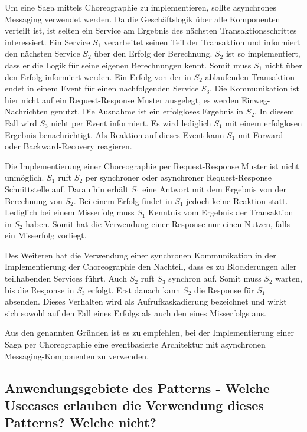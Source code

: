 Um eine Saga mittels Choreographie zu implementieren, sollte asynchrones Messaging verwendet werden. Da die Geschäftslogik über alle Komponenten verteilt ist, ist selten ein Service am Ergebnis des nächsten Transaktionsschrittes interessiert. Ein Service $S_1$ verarbeitet seinen Teil der Transaktion und informiert den nächsten Service $S_2$ über den Erfolg der Berechnung. $S_2$ ist so implementiert, dass er die Logik für seine eigenen Berechnungen kennt. Somit muss $S_1$ nicht über den Erfolg informiert werden. Ein Erfolg von der in $S_2$ ablaufenden Transaktion endet in einem Event für einen nachfolgenden Service $S_3$. Die Kommunikation ist hier nicht auf ein Request-Response Muster ausgelegt, es werden Einweg-Nachrichten genutzt.
Die Ausnahme ist ein erfolgloses Ergebnis in $S_2$. In diesem Fall wird $S_3$ nicht per Event informiert. Es wird lediglich $S_1$ mit einem erfolglosen Ergebnis benachrichtigt. Als Reaktion auf dieses Event kann $S_1$ mit Forward- oder Backward-Recovery reagieren.

Die Implementierung einer Choreographie per Request-Response Muster ist nicht unmöglich. $S_1$ ruft $S_2$ per synchroner oder asynchroner Request-Response Schnittstelle auf. Daraufhin erhält $S_1$ eine Antwort mit dem Ergebnis von der Berechnung von $S_2$. Bei einem Erfolg findet in $S_1$ jedoch keine Reaktion statt. Lediglich bei einem Misserfolg muss $S_1$ Kenntnis vom Ergebnis der Transaktion in $S_2$ haben. Somit hat die Verwendung einer Response nur einen Nutzen, falls ein Misserfolg vorliegt.

Des Weiteren hat die Verwendung einer synchronen Kommunikation in der Implementierung der Choreographie den Nachteil, dass es zu Blockierungen aller teilhabenden Services führt. Auch $S_2$ ruft $S_3$ synchron auf. Somit muss $S_2$ warten, bis die Response in $S_3$ erfolgt. Erst danach kann $S_2$ die Response für $S_1$ absenden. Dieses Verhalten wird als Aufrufkaskadierung bezeichnet und wirkt sich sowohl auf den Fall eines Erfolgs als auch den eines Misserfolgs aus. 

Aus den genannten Gründen ist es zu empfehlen, bei der Implementierung einer Saga per Choreographie eine eventbasierte Architektur mit asynchronen Messaging-Komponenten zu verwenden.

\subsection{Anwendungsgebiete des Patterns - Welche Usecases erlauben die Verwendung dieses Patterns? Welche nicht?}

